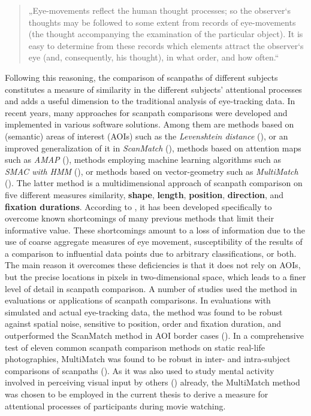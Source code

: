 \documentclass[a4paper, 12pt]{scrreprt}
\begin{document}
\begin{quotation}
\footnotesize{„Eye-movements reflect the human thought processes; so the observer‘s thoughts may be followed to some extent from records of eye-movements (the thought accompanying the examination of the particular object). It is easy to determine from these records which elements attract the observer‘s eye (and, consequently, his thought), in what order, and how often.“}
\end{quotation}

Following this reasoning, the comparison of scanpaths of different subjects constitutes a measure of similarity in the different subjects’ attentional processes and adds a useful dimension to the traditional analysis of eye-tracking data. \newline
In recent years, many approaches for scanpath comparisons were developed and implemented in various software solutions. Among them are methods based on (semantic) areas of interest (AOIs) such as the \textit{Levenshtein distance} (\cite{levenshtein1966binary}), or an improved generalization of it in \textit{ScanMatch} (\cite{cristino2010scanmatch}), methods based on attention maps such as \textit{AMAP} (\cite{ouerhani2004empirical}), methods employing machine learning algorithms such as \textit{SMAC with HMM} (\cite{coutrot2018scanpath}), or methods based on vector-geometry such as \textit{MultiMatch} (\cite{jarodzka2010vector}). The latter method is a multidimensional approach of scanpath comparison on five different measures similarity, \textbf{shape}, \textbf{length}, \textbf{position}, \textbf{direction}, and \textbf{fixation durations}. According to \textcite{jarodzka2010vector}, it has been developed specifically to overcome known shortcomings of many previous methods that limit their informative value. These shortcomings amount to a loss of information due to the use of coarse aggregate measures of eye movement, susceptibility of the results of a comparison to influential data points due to arbitrary classifications, or both. The main reason it overcomes these deficiencies is that it does not rely on AOIs, but the precise locations in pixels in two-dimensional space, which leads to a finer level of detail in scanpath comparison. \newline A number of studies used the method in evaluations or applications of scanpath comparisons. In evaluations with simulated and actual eye-tracking data, the method was found to be robust against spatial noise, sensitive to position, order and fixation duration, and outperformed the ScanMatch method in AOI border cases (\cite{dewhurst2012depends}). In a comprehensive test of eleven common scanpath comparison methods on static real-life photographies, MultiMatch was found to be robust in inter- and intra-subject comparisons of scanpaths (\cite{anderson2015comparison}). As it was also used to study mental activity involved in perceiving visual input by others (\cite{french2017evaluation}) already, the MultiMatch method was chosen to be employed in the current thesis to derive a measure for attentional processes of participants during movie watching. \newline
\end{document}
